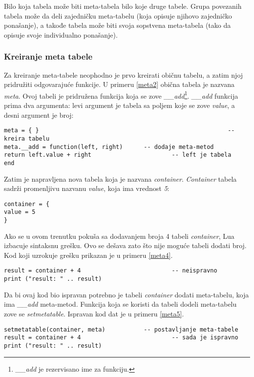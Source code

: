 \documentclass[a4paper]{article}
\begin{document}
Bilo koja tabela može biti meta-tabela bilo koje druge tabele. Grupa povezanih tabela može da deli zajedničku meta-tabelu (koja opisuje njihovo zajedničko ponašanje), a takođe tabela može biti svoja sopstvena meta-tabela (tako da opisuje svoje individualno ponašanje).

\subsubsection*{Kreiranje meta tabele}
Za kreiranje meta-tabele neophodno je prvo kreirati običnu tabelu, a zatim njoj pridružiti odgovarajuće funkcije. U primeru \ref{meta2} obična tabela je nazvana \textit{meta}. Ovoj tabeli je pridružena funkcija koja se zove \textit{\_\_add}\footnote{\textit{\_\_add} je rezervisano ime za funkciju.}. \textit{\_\_add} funkcija prima dva argumenta: levi argument je tabela sa poljem koje se zove \textit{value}, a desni argument je broj:
\begin{lstlisting}[caption={Kreiranje meta-tabele i dodavanje meta-metoda},frame=single, label=meta2]
meta = { } 														-- kreira tabelu
meta.__add = function(left, right)		-- dodaje meta-metod
return left.value + right 						-- left je tabela
end
\end{lstlisting}
Zatim je napravljena nova tabela koja je nazvana \textit{container}. \textit{Container} tabela sadrži promenljivu nazvanu \textit{value}, koja ima vrednost \textit{5}:
\begin{lstlisting}[caption={Tabela \textit{container}},frame=single, label=meta3]
container = {
value = 5
}
\end{lstlisting}
Ako se u ovom trenutku pokuša sa dodavanjem broja 4 tabeli \textit{container}, Lua izbacuje sintaksnu grešku. Ovo se dešava zato što nije moguće tabeli dodati broj. Kod koji uzrokuje grešku prikazan je u primeru \ref{meta4}.
\begin{lstlisting}[caption={Neispravno sabiranje tabele i broja},frame=single, label=meta4]
result = container + 4 							-- neispravno
print ("result: " .. result)
\end{lstlisting}
Da bi ovaj kod bio ispravan potrebno je tabeli \textit{container} dodati meta-tabelu, koja ima \textit{\_\_add} meta-metod. Funkcija koja se koristi da tabeli dodeli meta-tabelu zove se \textit{setmetatable}. Ispravan kod dat je u primeru \ref{meta5}.
\begin{lstlisting}[caption={Ispravno sabiranje tabele i broja},frame=single, label=meta5]
setmetatable(container, meta) 			-- postavljanje meta-tabele
result = container + 4 							-- sada je ispravno
print ("result: " .. result)
\end{lstlisting}
\end{document}
